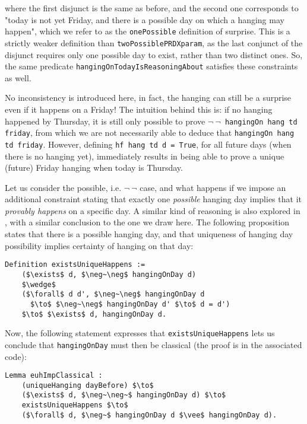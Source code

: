 \documentclass[runningheads]{llncs}
\begin{document}
where the first disjunct is the same as before, and
the second one corresponds to "today is not
  yet Friday, and there is a possible day on which a hanging may happen", which
  we refer to as the {\tt onePossible} definition of surprise. This is a strictly
weaker definition than {\tt twoPossiblePRDXparam}, as the last conjunct of the
disjunct requires only one possible day to exist, rather than two distinct ones.
So, the same predicate {\tt hangingOnTodayIsReasoningAbout} satisfies these
constraints as well.

No inconsistency is introduced here, in fact, the hanging can still be a surprise even if it
happens on a Friday! The intuition behind this is: if no hanging happened by
Thursday, it is still only possible to prove {\tt $\neg~\neg$~hangingOn hang td friday},
from which we are not necessarily able to deduce that {\tt hangingOn hang td friday}.
However, defining {\tt hf hang td d = True}, for all future days (when there is no hanging yet),
immediately results in being able to prove a unique (future) Friday hanging when today is Thursday.

Let us consider the possible, i.e. $\neg~\neg$ case, and
what happens if we impose an additional constraint stating that
exactly one \emph{possible} hanging
day implies that it \emph{provably happens} on a specific day. A similar kind of reasoning is also explored in
\cite{fourpossible}, with a similar conclusion to the one we draw here. The following
proposition states that there is a possible hanging day, and that uniqueness of hanging day
possibility implies certainty of hanging on that day:

\begin{lstlisting}[mathescape=true]
  Definition existsUniqueHappens :=
    ($\exists$ d, $\neg~\neg$ hangingOnDay d)
    $\wedge$
    ($\forall$ d d', $\neg~\neg$ hangingOnDay d
      $\to$ $\neg~\neg$ hangingOnDay d' $\to$ d = d')
    $\to$ $\exists$ d, hangingOnDay d.
\end{lstlisting}

Now, the following statement expresses that {\tt existsUniqueHappens} lets us
conclude that {\tt hangingOnDay} must then be classical (the proof is in the
associated code):

\begin{lstlisting}[mathescape=true]
  Lemma euhImpClassical :
    (uniqueHanging dayBefore) $\to$
    ($\exists$ d, $\neg~\neg~$ hangingOnDay d) $\to$
    existsUniqueHappens $\to$
    ($\forall$ d, $\neg~$ hangingOnDay d $\vee$ hangingOnDay d).
\end{lstlisting}
\end{document}
